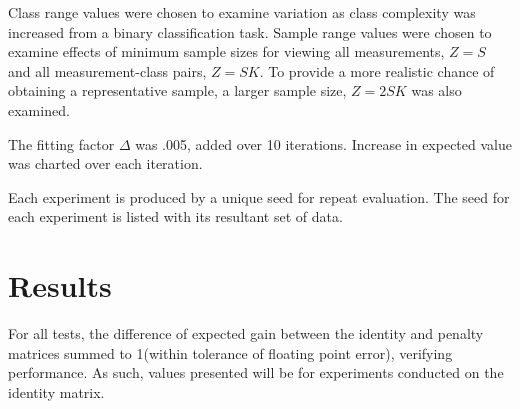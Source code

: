 \documentclass[10pt, conference]{IEEEtran}
\begin{document}
Class range values were chosen to examine variation as class complexity was increased from a binary classification task. Sample range values were chosen to examine effects of minimum sample sizes for viewing all measurements, $Z=S$ and all measurement-class pairs, $Z= SK$. To provide a more realistic chance of obtaining a representative sample, a larger sample size, $Z = 2SK$ was also examined. 

The fitting factor $\Delta$ was .005, added over 10 iterations. Increase in expected value was charted over each iteration.

Each experiment is produced by a unique seed for repeat evaluation. The seed for each experiment is listed with its resultant set of data. 
\section{Results}
For all tests, the difference of expected gain between the identity and penalty matrices summed to 1(within tolerance of floating point error), verifying performance. As such, values presented will be for experiments conducted on the identity matrix. 
\end{document}
